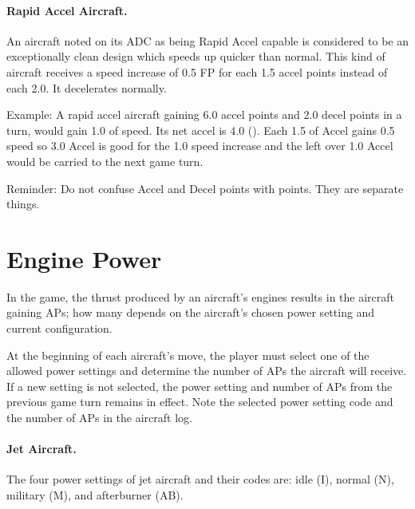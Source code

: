 
\paragraph{Rapid Accel Aircraft.} An aircraft noted on its ADC as being Rapid Accel capable is considered to be an exceptionally clean design which speeds up quicker than normal. This kind of aircraft receives a speed increase of 0.5 FP for each 1.5 accel points instead of each 2.0. It decelerates normally.

Example: A rapid accel aircraft gaining 6.0 accel points and 2.0 decel points in a turn, would gain 1.0 of speed. Its net accel is 4.0 (). Each 1.5 of Accel gains 0.5 speed so 3.0 Accel is good for the 1.0 speed increase and the left over 1.0 Accel would be carried to the next game turn.

Reminder:  Do not confuse Accel and Decel points with  points. They are separate things.

\section{Engine Power}
\label{rule:engine-thrust}

In the game, the thrust produced by an aircraft's engines results in the aircraft gaining APs; how many depends on the aircraft's chosen power setting and current configuration. 

At the beginning of each aircraft's move, the player must select one of the allowed power settings and determine the number of APs the aircraft will receive. If a new setting is not selected, the power setting and number of APs from the previous game turn remains in effect. Note the selected power setting code and the number of APs in the aircraft log.

\paragraph{Jet Aircraft.} The four power settings of jet aircraft and their codes are: idle (I), normal (N), military (M), and afterburner (AB).

